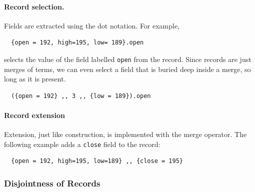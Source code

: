 \paragraph{Record selection.} Fields are extracted using the dot notation. For
example,
\begin{lstlisting}
  {open = 192, high=195, low= 189}.open
\end{lstlisting}
selects the value of the field labelled \lstinline{open} from the record. Since
records are just merges of terms, we can even select a field that is buried deep
inside a merge, so long as it is present.
\begin{lstlisting}
  ({open = 192} ,, 3 ,, {low = 189}).open
\end{lstlisting}


\paragraph{Record extension} Extension, just like construction, is implemented
with the merge operator. The following example adds a \lstinline{close} field to
the record:
\begin{lstlisting}
  {open = 192, high=195, low=189} ,, {close = 195}
\end{lstlisting}

\subsubsection{Disjointness of Records}

